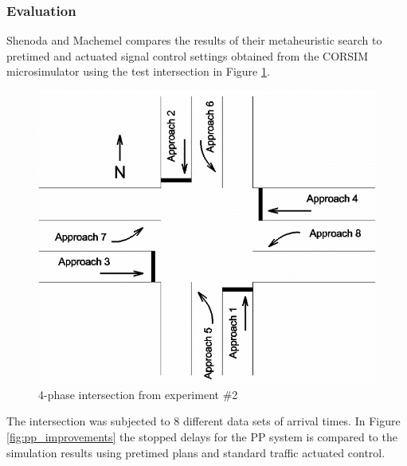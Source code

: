 \subsubsection*{Evaluation}

Shenoda and Machemel compares the results of their metaheuristic
search to pretimed and actuated signal control settings obtained from
the CORSIM microsimulator using the test intersection in Figure
\ref{fig:pp_intersection}.

\begin{figure}[!ht]
\begin{center}
\includegraphics[scale=0.35]{phase-by-phase_testing-intersection.png} 
\end{center}
\caption{4-phase intersection from experiment \#2}
\label{fig:pp_intersection}
\end{figure}

The intersection was subjected to 8 different data sets of arrival
times. In Figure \ref{fig:pp_improvements} the stopped delays for the
PP system is compared to the simulation results using pretimed plans
and standard traffic actuated control.

